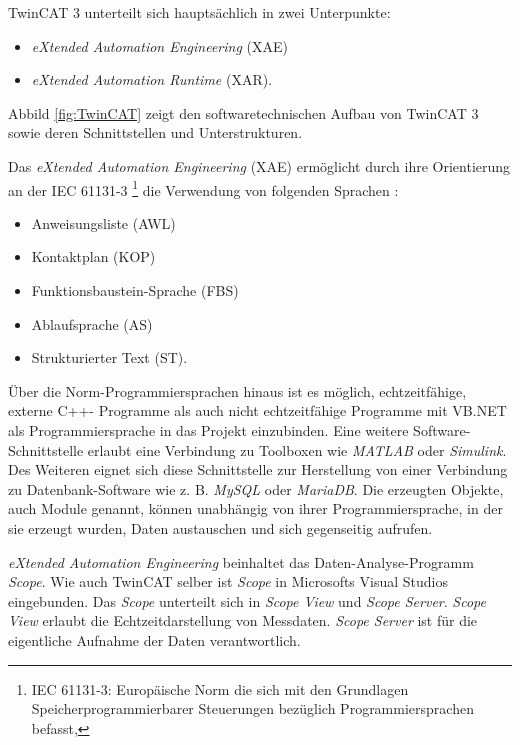 TwinCAT 3 unterteilt sich hauptsächlich in zwei Unterpunkte: 

\begin{itemize}
\item	\textit{eXtended Automation Engineering} (XAE)
\item	\textit{eXtended Automation Runtime} (XAR).
\end{itemize}

Abbild \ref{fig:TwinCAT} zeigt den softwaretechnischen Aufbau von TwinCAT 3 sowie deren Schnittstellen und Unterstrukturen.

Das \textit{eXtended Automation Engineering} (XAE) ermöglicht durch ihre Orientierung an der IEC 61131-3 \footnote{IEC 61131-3:  Europäische Norm die sich mit den Grundlagen Speicherprogrammierbarer Steuerungen bezüglich Programmiersprachen befasst,} die Verwendung von folgenden Sprachen :

\begin{itemize}
\item	Anweisungsliste (AWL)
\item	Kontaktplan (KOP)
\item 	Funktionsbaustein-Sprache (FBS)
\item	Ablaufsprache (AS)
\item	Strukturierter Text (ST).
\end{itemize}

Über die Norm-Programmiersprachen hinaus ist es möglich, echtzeitfähige, externe C++- Programme als auch nicht echtzeitfähige Programme mit VB.NET  als Programmiersprache in das Projekt einzubinden. Eine weitere Software-Schnittstelle erlaubt eine Verbindung zu  Toolboxen wie \textit{MATLAB} oder \textit{Simulink}. Des Weiteren eignet sich diese Schnittstelle zur Herstellung von einer Verbindung zu Datenbank-Software wie z. B.\textit{ MySQL} oder \textit{MariaDB}. Die erzeugten Objekte, auch Module genannt, können unabhängig von ihrer Programmiersprache, in der sie erzeugt wurden,  Daten austauschen und sich gegenseitig aufrufen. 

\textit{eXtended Automation Engineering} beinhaltet das Daten-Analyse-Programm \textit{Scope}. Wie auch TwinCAT selber ist \textit{Scope} in Microsofts Visual Studios eingebunden. Das \textit{Scope} unterteilt sich in \textit{Scope View} und \textit{Scope Server}. \textit{Scope View} erlaubt die Echtzeitdarstellung von Messdaten.  \textit{Scope Server} ist für die eigentliche Aufnahme der Daten verantwortlich.


